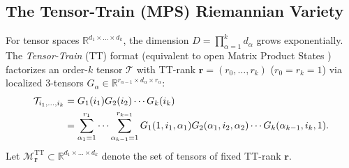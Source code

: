 \documentclass[11pt,a4paper,reqno]{amsart}
\theoremstyle{definition}
\numberwithin{equation}{section}
\providecommand{\R}{\mathbb{R}}
\providecommand{\R}{\mathbb{R}}
\begin{document}
\subsection{The Tensor-Train (MPS) Riemannian Variety}
\label{subsec:tensor_train_manifold}
For tensor spaces $\R^{d_1 \times \dots \times d_k}$, the dimension $D = \prod_{\alpha=1}^k d_\alpha$ grows exponentially. The \emph{Tensor-Train} (TT) format (equivalent to open Matrix Product States \cite{verstraete2010continuous}) factorizes an order-$k$ tensor $\mathcal{T}$ with TT-rank $\mathbf{r} = (r_0, \dots, r_k)$ ($r_0 = r_k = 1$) via localized 3-tensors $G_\alpha \in \R^{r_{\alpha-1} \times d_\alpha \times r_\alpha}$:
\begin{align}
    \label{eq:tt_decomposition}
    \mathcal{T}_{i_1, \dots, i_k} &= G_1(i_1) G_2(i_2) \cdots G_k(i_k) \\
    &= \sum_{\alpha_1=1}^{r_1} \cdots \sum_{\alpha_{k-1}=1}^{r_{k-1}} G_1(1, i_1, \alpha_1) G_2(\alpha_1, i_2, \alpha_2) \cdots G_k(\alpha_{k-1}, i_k, 1). \notag
\end{align}
Let $\mathcal{M}_{\mathbf{r}}^{\mathrm{TT}} \subset \R^{d_1 \times \dots \times d_k}$ denote the set of tensors of fixed TT-rank $\mathbf{r}$.
\end{document}
